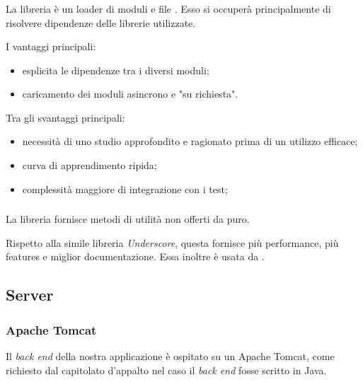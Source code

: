 \subsubsection{\requirejs}
La libreria \requirejs{} è un loader di moduli e file \js{}. Esso si occuperà principalmente di risolvere dipendenze delle librerie \js{} utilizzate.

I vantaggi principali:
\begin{itemize}
	\item esplicita le dipendenze tra i diversi moduli;
	\item caricamento dei moduli asincrono e "su richiesta".
\end{itemize}

Tra gli svantaggi principali:
\begin{itemize}
\item necessità di uno studio approfondito e ragionato prima di un utilizzo efficace;
\item curva di apprendimento ripida;
\item complessità maggiore di integrazione con i test; 
\end{itemize} 

\subsubsection{\lodash}
La libreria \lodash{} fornisce metodi di utilità non offerti da \js{} puro. 

Rispetto alla simile libreria \emph{Underscore}, questa fornisce più performance, più features e miglior documentazione. Essa inoltre è usata da \jointjs.



\subsection{Server}

\subsubsection{Apache Tomcat}
Il \emph{back end} della nostra applicazione è ospitato su un  Apache Tomcat, come richiesto dal capitolato d'appalto nel caso il \emph{back end} fosse scritto in Java.

